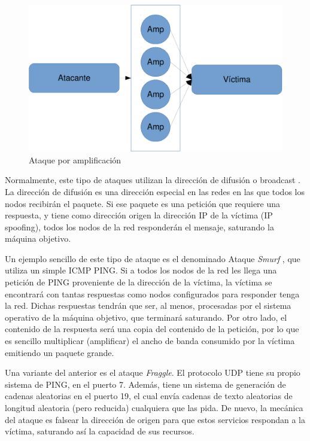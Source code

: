 \begin{figure}[htbp]
\centering
\includegraphics[width=.8\textwidth]{CapituloDDoS/Figuras/Amplificacion}
\caption{Ataque por amplificación}
\end{figure}
%

Normalmente, este tipo de ataques utilizan la dirección de difusión o broadcast  . La 
dirección de difusión es una dirección especial en las redes en las que todos los nodos recibirán el paquete. Si ese 
paquete es una petición que requiere una respuesta, y tiene como dirección origen la dirección IP de la víctima (IP 
spoofing), todos los nodos de la red responderán el mensaje, saturando la máquina objetivo.

Un ejemplo sencillo de este tipo de ataque es el denominado Ataque \emph{Smurf} , que utiliza un 
simple \gls{ICMP} PING. Si a todos los nodos de la red les llega una petición de PING 
proveniente de la dirección de la víctima, la víctima se encontrará con tantas respuestas como nodos configurados para 
responder tenga la red. Dichas respuestas tendrán que ser, al menos, procesadas por el sistema operativo de la máquina 
objetivo, que terminará saturando. Por otro lado, el contenido de la respuesta será una copia del contenido de la 
petición, por lo que es sencillo multiplicar (amplificar) el ancho de banda consumido por la víctima emitiendo un 
paquete grande.

Una variante del anterior es el ataque \emph{Fraggle}. El protocolo \gls{UDP} tiene su propio sistema de PING, en 
el puerto 7. Además, tiene un sistema de generación de cadenas aleatorias en el puerto 19, el cual envía cadenas de 
texto aleatorias de longitud aleatoria (pero reducida) cualquiera que las pida. De nuevo, la mecánica del ataque es 
falsear la dirección de origen para que estos servicios respondan a la víctima, saturando así la capacidad de sus 
recursos.


